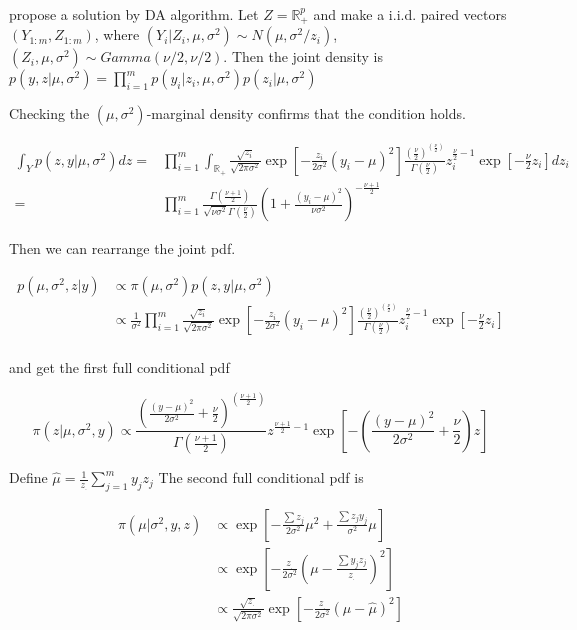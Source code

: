 \documentclass[12pt]{article}
\begin{document}
\citet{mengSeekingEfficientData1999} propose a solution by DA algorithm.
Let \(Z=\mathbb{R}^p_{+}\) and make a i.i.d. paired vectors
\((Y_{1:m},Z_{1:m})\), where
\((Y_{i}|Z_{i},\mu,\sigma^2)\sim N(\mu,\sigma^2/z_i)\),
\((Z_{i},\mu,\sigma^2) \sim Gamma(\nu/2,\nu/2)\). Then the joint density
is
\(p(y,z|\mu,\sigma^2)=\prod_{i=1}^mp(y_i|z_i,\mu,\sigma^2)p(z_i|\mu,\sigma^2)\)

Checking the \((\mu,\sigma^2)\)-marginal density confirms that the
condition holds.

\[\begin{aligned}\int_Y p(z,y|\mu,\sigma^2)dz=&\prod_{i=1}^m\int_{\mathbb{R}_{+}}\frac{\sqrt{z_i}}{\sqrt{2\pi\sigma^2}}\exp\left[-\frac{z_i}{2\sigma^2}(y_i-\mu)^2\right]\frac{(\frac{\nu}2)^{(\frac{\nu}2)}}{\Gamma(\frac{\nu}2)}z_i^{\frac{\nu}2-1}\exp\left[-\frac{\nu}{2}z_i\right]dz_i\\
=&\prod_{i=1}^m\frac{\Gamma(\frac{\nu+1}2)}{\sqrt{\nu\sigma^2}\Gamma(\frac{\nu}2)}(1+\frac{(y_i-\mu)^2}{\nu\sigma^2})^{-\frac{\nu+1}2}\end{aligned}\]

Then we can rearrange the joint pdf.

\[\begin{aligned}
p(\mu,\sigma^2,z|y)&\propto\pi(\mu,\sigma^2)p(z,y|\mu,\sigma^2)\\
                     &\propto\frac{1}{\sigma^2}\prod_{i=1}^m\frac{\sqrt{z_i}}{\sqrt{2\pi\sigma^2}}\exp\left[-\frac{z_i}{2\sigma^2}(y_i-\mu)^2\right]\frac{(\frac{\nu}2)^{(\frac{\nu}2)}}{\Gamma(\frac{\nu}2)}z_i^{\frac{\nu}2-1}\exp\left[-\frac{\nu}{2}z_i\right]\\
\end{aligned}\]

and get the first full conditional pdf

\[ \pi(z|\mu,\sigma^2,y)\propto \frac{(\frac{(y-\mu)^2}{2\sigma^2}+\frac{\nu}{2})^{(\frac{\nu+1}2)}}{\Gamma(\frac{\nu+1}2)}z^{\frac{\nu+1}2-1}\exp\left[-\left(\frac{(y-\mu)^2}{2\sigma^2}+\frac{\nu}{2}\right)z\right]\]

Define \(\hat\mu=\frac{1}{z_{.}}\sum_{j=1}^my_jz_j\) The second full
conditional pdf is

\[\begin{aligned}
\pi(\mu|\sigma^2,y,z)&\propto\exp\left[-\frac{\sum z_j}{2\sigma^2}\mu^2+\frac{\sum z_jy_j}{\sigma^2}\mu\right]\\
&\propto\exp\left[-\frac{z_.}{2\sigma^2}(\mu-\frac{\sum y_jz_j}{z_{.}})^2\right]\\
&\propto\frac{\sqrt{z_.}}{\sqrt{2\pi\sigma^2}}\exp\left[-\frac{z_.}{2\sigma^2}(\mu-\hat\mu)^2\right]
\end{aligned}\]
\end{document}
